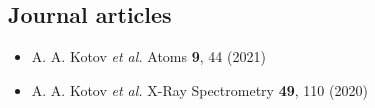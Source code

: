 \documentclass[10pt,a4paper,ragged2e, academicons]{altacv}
\begin{document}
\newpage
\begin{fullwidth}

    \nocite{*}



    \vspace{-0.5cm}
    \subsection*{Journal articles}
    \begin{itemize}
        \item A. A. Kotov \textit{et al.} Atoms \textbf{9}, 44 (2021)
        \item A. A. Kotov \textit{et al.} X-Ray Spectrometry \textbf{49}, 110 (2020)
    \end{itemize}

    \divider

    \printbibliography[heading=pubtype,title={{Conferences}}, type=inproceedings]
\end{fullwidth}
\end{document}
